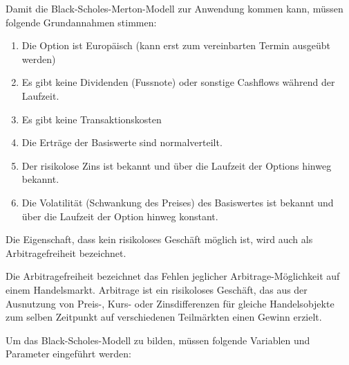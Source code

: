 Damit die Black-Scholes-Merton-Modell zur Anwendung kommen kann, müssen folgende Grundannahmen stimmen:
\begin{enumerate}
	\item Die Option ist Europäisch (kann erst zum vereinbarten Termin ausgeübt werden)
	\item Es gibt keine Dividenden (Fussnote) oder sonstige Cashflows während der Laufzeit.
	\item Es gibt keine Transaktionskosten
	\item Die Erträge der Basiswerte sind normalverteilt.
	\item Der risikolose Zins ist bekannt und über die Laufzeit der Options hinweg bekannt.
	\item Die Volatilität (Schwankung des Preises) des Basiswertes ist bekannt und über die Laufzeit der Option hinweg konstant.
\end{enumerate}


Die Eigenschaft, dass kein risikoloses Geschäft möglich ist, wird auch als Arbitragefreiheit bezeichnet. 

\begin{definition}
	Die Arbitragefreiheit bezeichnet das Fehlen jeglicher Arbitrage-Möglichkeit auf einem Handelsmarkt. Arbitrage ist ein risikoloses Geschäft, das aus der Ausnutzung von Preis-, Kurs- oder Zinsdifferenzen für gleiche Handelsobjekte zum selben Zeitpunkt auf verschiedenen Teilmärkten einen Gewinn erzielt.
\end{definition} 

Um das Black-Scholes-Modell zu bilden, müssen folgende Variablen und Parameter eingeführt werden:

